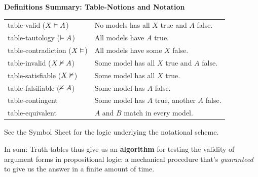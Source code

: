\documentclass[options]{philosophersimprint}
\theoremstyle{definition}
\begin{document}
\begin{framed}
\noindent\textbf{Definitions Summary: Table-Notions and Notation}\\
\begin{tabular}{l | l}%
table-valid ($X\vDash A$) & No models has all $X$ true and $A$ false.\\
table-tautology ($\vDash A$) & All models have $A$ true.\\
table-contradiction ($X\vDash$) & All models have some $X$ false.\\
table-invalid ($X\nvDash A$) & Some model has all $X$ true and $A$ false.\\
table-satisfiable ($X\nvDash$) & Some model has all $X$ true. \\
table-falsifiable ($\nvDash A$) & Some model has $A$ false.\\
table-contingent & Some model has $A$ true, another $A$ false.\\
table-equivalent & $A$ and $B$ match in every model.
\end{tabular}

\smallskip
\noindent\footnotesize See the Symbol Sheet for the logic underlying the notational scheme.
\end{framed}

In sum: Truth tables thus give us an \textbf{algorithm} for testing the validity of argument forms in propositional logic: a mechanical procedure that's \textit{guaranteed} to give us the answer in a finite amount of time.
\end{document}
